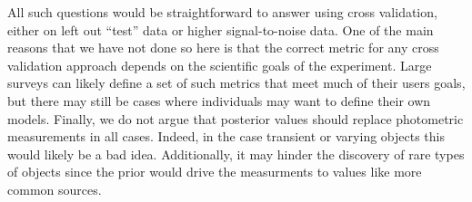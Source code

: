 \documentclass[12pt,preprint]{aastex}
\begin{document}
All such questions would be straightforward to answer using cross validation,
either on left out ``test'' data or higher signal-to-noise data.  One of the
main reasons that we have not done so here is that the correct metric for any
cross validation approach depends on the scientific goals of the experiment.  
Large surveys can likely define a set of such metrics that meet much of their 
users goals, but there may still be cases where individuals may want to define
their own models.  Finally, we do not argue that posterior values should 
replace photometric measurements in all cases.  Indeed, in the case transient
or varying objects this would likely be a bad idea.  Additionally, it may
hinder the discovery of rare types of objects since the prior would drive the
measurments to values like more common sources.
\end{document}
